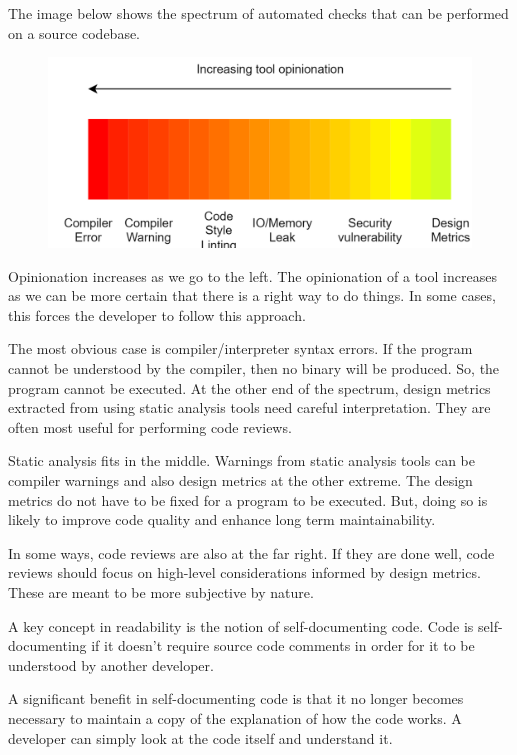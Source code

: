 \documentclass[a4paper, openany]{memoir}
\begin{document}
The image below shows the spectrum of automated checks that can be performed on a source codebase.
\begin{figure}[H]
    \centering
    \includegraphics[scale=0.3]{src/10.1 opinionation.PNG}
\end{figure}
\noindent Opinionation increases as we go to the left. The opinionation of a tool increases as we can be more certain that there is a right way to do things. In some cases, this forces the developer to follow this approach.

The most obvious case is compiler/interpreter syntax errors. If the program cannot be understood by the compiler, then no binary will be produced. So, the program cannot be executed. At the other end of the spectrum, design metrics extracted from using static analysis tools need careful interpretation. They are often most useful for performing code reviews.

Static analysis fits in the middle. Warnings from static analysis tools can be compiler warnings and also design metrics at the other extreme. The design metrics do not have to be fixed for a program to be executed. But, doing so is likely to improve code quality and enhance long term maintainability.

In some ways, code reviews are also at the far right. If they are done well, code reviews should focus on high-level considerations informed by design metrics. These are meant to be more subjective by nature.

A key concept in readability is the notion of self-documenting code. Code is self-documenting if it doesn't require source code comments in order for it to be understood by another developer.

A significant benefit in self-documenting code is that it no longer becomes necessary to maintain a copy of the explanation of how the code works. A developer can simply look at the code itself and understand it.
\end{document}

